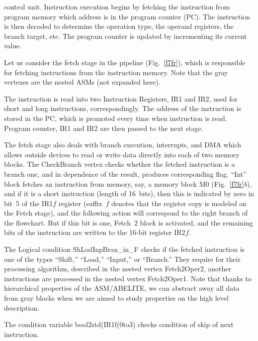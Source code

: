 \begin{multicols}{2}


\noindent
 control unit. Instruction execution begins by fetching the instruction from 
program memory which address is in the program counter (PC). The instruction is then decoded 
to determine the operation type, the operand registers, the branch target, etc. The program counter 
is updated by incrementing its current value.


Let us consider the fetch stage in the pipeline (Fig.~\ref{f7fr}), which is responsible for fetching 
instructions from the instruction memory. Note that the gray vertexes are the nested ASMs (not 
expanded here). 
       
       The instruction is read into two Instruction Registers, IR1 and IR2, used for short and long 
instructions, correspondingly. The address of the instruction is stored in the 
PC, which is promoted every time when instruction is read. Program counter, IR1 and IR2 are then passed to 
the next stage.
    
The fetch stage also deals with branch execution, interrupts, and DMA 
which allows outside devices to read or write data directly into each of two memory blocks.  The 
CheckBranch  vertex checks whether  the fetched instruction is a branch one, and in dependence 
of the result, produces corresponding flag. ``Int'' block fetches an instruction from memory, say, a 
memory block M0 (Fig.~\ref{f7fr}\textit{b}), and if it is a short instruction (length of 16~bits), 
then this is indicated by zero in bit~5 of the IR1$f$ register (suffix~$f$ denotes that the register 
copy is modeled on the Fetch stage), and the following action will correspond to the right branch 
of the flowchart. But if this bit is one, Fetch~2 block is activated, and the remaining bits of the 
instruction are written to the 16-bit register IR2$f$.
       
       The Logical condition ShLodInpBran\_in\_F checks if the fetched instruction is one of the 
types ``Shift,'' ``Load,'' ``Input,'' or ``Branch.'' They require for their processing algorithm, 
described in the nested vertex Fetch2Oper2, another instructions are processed in the nested 
vertex Fetch2Oper1. Note that thanks to hierarchical properties of the ASM/ABELITE, we can 
abstract away all data from gray blocks when we are aimed to study properties on the high level 
description.     

       The condition variable bool2std(IR1f(0to3) checks condition of skip of next instruction. 
       

\end{multicols}
